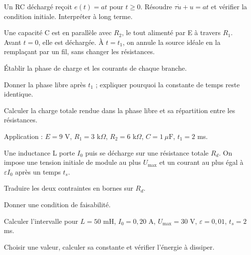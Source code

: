 \begin{questions}
\item Un RC déchargé reçoit $e(t)=at$ pour $t\geq0$. Résoudre $\tau\dot u+u=at$ et vérifier la condition initiale. Interpréter à long terme.
\end{questions}



\label{ex-D1}
Une capacité C est en parallèle avec $R_2$, le tout alimenté par E à travers $R_1$. Avant $t=0$, elle est déchargée. À $t=t_1$, on annule la source idéale en la remplaçant par un fil, sans changer les résistances.\begin{questions}
\item Établir la phase de charge et les courants de chaque branche.
\item Donner la phase libre après $t_1$ ; expliquer pourquoi la constante de temps reste identique.
\item Calculer la charge totale rendue dans la phase libre et sa répartition entre les résistances.
\item Application : $E=9$ V, $R_1=3$ k$\Omega$, $R_2=6$ k$\Omega$, $C=1\ \mu\mathrm{ F}$, $t_1=2$ ms.
\end{questions}


\label{ex-D2}
Une inductance L porte $I_0$ puis se décharge sur une résistance totale $R_d$. On impose une tension initiale de module au plus $U_{\max}$ et un courant au plus égal à $\varepsilon I_0$ après un temps $t_s$.\begin{questions}
\item Traduire les deux contraintes en bornes sur $R_d$.
\item Donner une condition de faisabilité.
\item Calculer l’intervalle pour $L=50$ mH, $I_0=0{,}20$ A, $U_{\max}=30$ V, $\varepsilon=0{,}01$, $t_s=2$ ms.
\item Choisir une valeur, calculer sa constante et vérifier l’énergie à dissiper.
\end{questions}


